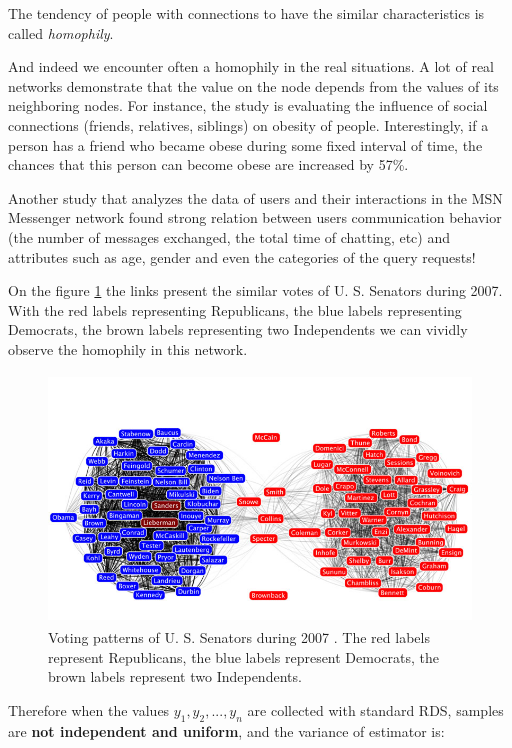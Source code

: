\documentclass[12pt]{report}
\begin{document}
The tendency of people with connections to have the similar characteristics is called \textit{homophily}.

And indeed we encounter often a homophily in the real situations. A lot of real networks demonstrate that the value on the node depends from the values of its neighboring nodes. For instance, the study \cite{christakis2007spread} is evaluating the influence of social connections (friends, relatives, siblings) on obesity of people. Interestingly, if a person has a friend who became obese during some fixed interval of time, the chances that this person can become obese are increased by 57\%. 

Another study \cite{singla2008yes} that analyzes the data of users and their interactions in the MSN Messenger network found strong relation between users communication behavior (the number of messages exchanged, the total time of chatting, etc) and attributes such as age, gender and even the categories of the query requests!

On the figure \ref{fig:senators} the links present the similar votes of U. S. Senators during 2007. With the red labels representing Republicans, the blue labels representing Democrats, the brown labels representing two Independents we can vividly observe the homophily in this network.


\begin{figure}[t]
    \centering
    \includegraphics[height = 250px]{senate}
    \caption{ Voting patterns of U. S. Senators during 2007 \cite{Senate}. The red labels represent Republicans, the blue labels represent Democrats, the brown labels represent two Independents.}
    \label{fig:senators}
\end{figure}

Therefore when the values $y_1, y_2, ..., y_n$ are collected with standard RDS, samples are \textbf{not independent and uniform}, and the variance of estimator is:
\end{document}
